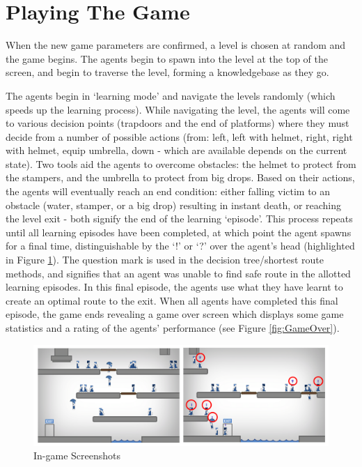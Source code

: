 \documentclass[a4paper,oneside]{report}
\begin{document}
\section{Playing The Game}

When the new game parameters are confirmed, a level is chosen at random and the game begins. The agents begin to spawn into the level at the top of the screen, and begin to traverse the level, forming a knowledgebase as they go. 

The agents begin in `learning mode' and navigate the levels randomly (which speeds up the learning process). While navigating the level, the agents will come to various decision points (trapdoors and the end of platforms) where they must decide from a number of possible actions (from: left, left with helmet, right, right with helmet, equip umbrella, down - which are available depends on the current state). Two tools aid the agents to overcome obstacles: the helmet to protect from the stampers, and the umbrella to protect from big drops. Based on their actions, the agents will eventually reach an end condition: either falling victim to an obstacle (water, stamper, or a big drop) resulting in instant death, or reaching the level exit - both signify the end of the learning `episode'. This process repeats until all learning episodes have been completed, at which point the agent spawns for a final time, distinguishable by the `!'  or `?' over the agent's head (highlighted in Figure \ref{fig:GameScreen}). The question mark is used in the decision tree/shortest route methods, and signifies that an agent was unable to find safe route in the allotted learning episodes. In this final episode, the agents use what they have learnt to create an optimal route to the exit. When all agents have completed this final episode, the game ends revealing a game over screen which displays some game statistics and a rating of the agents' performance (see Figure \ref{fig:GameOver}).

\begin{figure}[H]
  \centering
    \includegraphics[width=140mm]{sources/images/Screen_Game}
    \caption{In-game Screenshots}
    \label{fig:GameScreen}
\end{figure}
\end{document}
